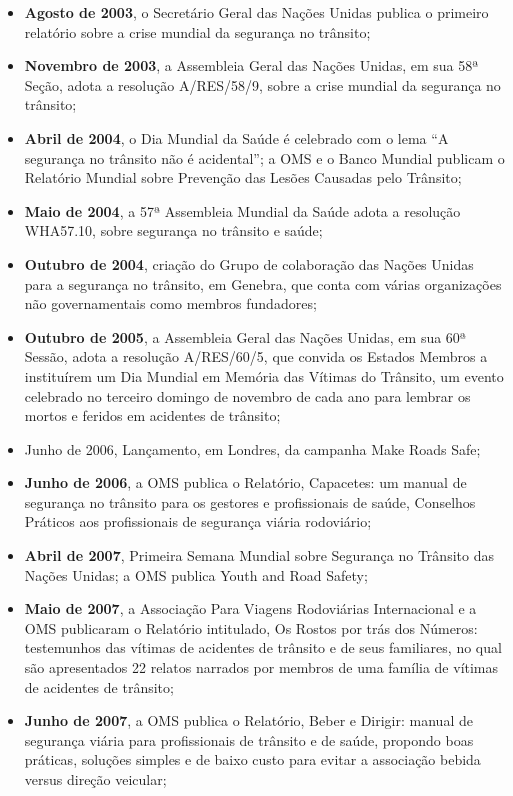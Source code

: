 \newpage
\begin{itemize}
\item \textbf{Agosto de 2003}, o Secretário Geral das Nações Unidas publica o primeiro relatório sobre a crise mundial da segurança no trânsito;
\item \textbf{Novembro de 2003}, a Assembleia Geral das Nações Unidas, em sua 58ª Seção, adota a resolução A/RES/58/9, sobre a crise mundial da segurança no trânsito;
\item \textbf{Abril de 2004}, o Dia Mundial da Saúde é celebrado com o lema “A segurança no trânsito não é acidental”; a OMS e o Banco Mundial publicam o Relatório Mundial sobre Prevenção das Lesões Causadas pelo Trânsito;
\item \textbf{Maio de 2004}, a 57ª Assembleia Mundial da Saúde adota a resolução WHA57.10, sobre segurança no trânsito e saúde;
\item \textbf{Outubro de 2004}, criação do Grupo de colaboração das Nações Unidas para a segurança no trânsito, em Genebra, que conta com várias organizações não governamentais como membros fundadores;
\item \textbf{Outubro de 2005}, a Assembleia Geral das Nações Unidas, em sua 60ª Sessão, adota a resolução A/RES/60/5, que convida os Estados Membros a instituírem um Dia Mundial em Memória das Vítimas do Trânsito, um evento celebrado no terceiro domingo de novembro de cada ano para lembrar os mortos e feridos em acidentes de trânsito;
\item Junho de 2006, Lançamento, em Londres, da campanha Make Roads Safe;
\item \textbf{Junho de 2006}, a OMS publica o Relatório, Capacetes: um manual de segurança no trânsito para os gestores e profissionais de saúde, Conselhos Práticos aos profissionais de segurança viária rodoviário;
\item \textbf{Abril de 2007}, Primeira Semana Mundial sobre Segurança no Trânsito das Nações Unidas; a OMS publica Youth and Road Safety;
\item \textbf{Maio de 2007}, a Associação Para Viagens Rodoviárias Internacional e a OMS publicaram o Relatório intitulado, Os Rostos por trás dos Números: testemunhos das vítimas de acidentes de trânsito e de seus familiares, no qual são apresentados 22 relatos narrados por membros de uma família de vítimas de acidentes de trânsito;
\item \textbf{Junho de 2007}, a OMS publica o Relatório, Beber e Dirigir: manual de segurança viária para profissionais de trânsito e de saúde, propondo boas práticas, soluções simples e de baixo custo para evitar a associação bebida versus direção veicular;

\end{itemize}
